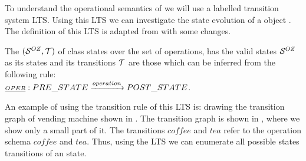 To understand the operational semantics of \oz{} we will use  a labelled transition system LTS. Using this LTS we can investigate the state evolution of a \oz{} object . The definition of this LTS is adapted from  with some changes.

\begin{definition}[LTS of \oz{}]
\label{def_oz_trans_system}
The  $(\stats,\traces)$ of \oz{} class states over the set of operations, has the valid states $\mathcal S^{OZ}$ as its states and its transitions $\traces$ are those which can be inferred from the following rule: \\$\underline{\scriptstyle{OPER}}: PRE\_STATE \xrightarrow{operation} POST\_STATE$.
\end{definition}
An example of using the transition rule of this LTS is: drawing the transition graph of vending machine shown in  . The transition graph is shown in , where we show only a small part of it. The transitions $coffee$ and $tea$ refer to the operation schema $coffee$ and $tea$. Thus, using the LTS we can enumerate all possible states transitions of an \oz{} state.


